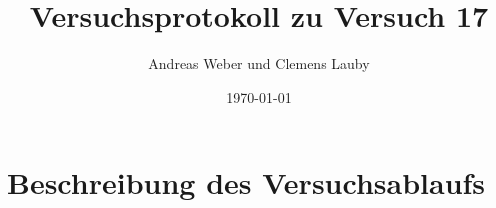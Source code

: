 \documentclass[a4paper]{scrartcl}
\title{Versuchsprotokoll zu Versuch 17}
\author{Andreas Weber und Clemens Lauby}
\date{\today}
\begin{document}
	
	\maketitle
	\newpage
	
	
	\section{Beschreibung des Versuchsablaufs}
	
	
	
	
	
	
	
	
	
	
	
\end{document}
